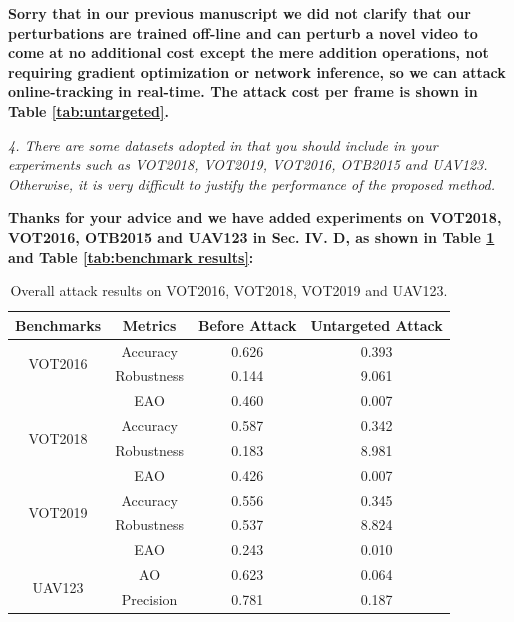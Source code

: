\documentclass[12pt]{article}
\begin{document}
\textbf{Sorry that in our previous manuscript we did not clarify that our perturbations are trained off-line and can perturb a novel video to come at no additional cost except the mere addition operations, not requiring gradient optimization or network inference, so we can attack online-tracking in real-time. The attack cost per frame is shown in Table \ref{tab:untargeted}.}

\textit{4. There are some datasets adopted in \cite{SPARK,RTAA} that you should include in your experiments such as VOT2018, VOT2019, VOT2016, OTB2015 and UAV123. Otherwise, it is very difficult to justify the performance of the proposed method.}

\textbf{Thanks for your advice and we have added experiments on VOT2018, VOT2016, OTB2015 and UAV123 in Sec. IV. D, as shown in Table \ref{tab:benchmark results1} and Table \ref{tab:benchmark results}:}

\begin{table}[h]
    \centering
    \caption{Overall attack results on VOT2016, VOT2018, VOT2019 and UAV123.}
    \begin{tabular}{c c | c | c}
    \toprule
    Benchmarks & Metrics & Before Attack    & Untargeted Attack  \\
    \midrule
    \multirow{2}{*}[-6pt]{VOT2016} 
    & Accuracy   & 0.626 & 0.393\\
    & Robustness & 0.144 & 9.061\\
    & EAO        & 0.460 & 0.007\\
    \midrule
    \multirow{2}{*}[-6pt]{VOT2018} 
    & Accuracy   & 0.587 & 0.342\\
    & Robustness & 0.183 & 8.981\\
    & EAO        & 0.426 & 0.007\\
    \midrule
    \multirow{2}{*}[-6pt]{VOT2019} 
    & Accuracy   & 0.556 & 0.345\\
    & Robustness & 0.537 & 8.824\\
    & EAO        & 0.243 & 0.010\\
    \midrule
    \multirow{3}{*}[+6pt]{UAV123} 
    & AO  & 0.623 & 0.064\\
    & Precision & 0.781 & 0.187\\
    \bottomrule
    \end{tabular}
    \label{tab:benchmark results1}
\end{table}
\end{document}
